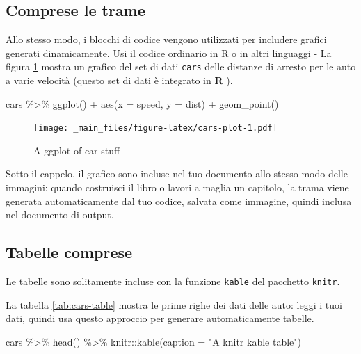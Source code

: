 \documentclass[a4paper, 11pt, nobind]{templates/ociamthesis}
\newenvironment{Shaded}{\begin{snugshade}}{\end{snugshade}}
\newcommand{\AttributeTok}[1]{\textcolor[rgb]{0.77,0.63,0.00}{#1}}
\newcommand{\FunctionTok}[1]{\textcolor[rgb]{0.00,0.00,0.00}{#1}}
\newcommand{\NormalTok}[1]{#1}
\newcommand{\SpecialCharTok}[1]{\textcolor[rgb]{0.00,0.00,0.00}{#1}}
\newcommand{\StringTok}[1]{\textcolor[rgb]{0.31,0.60,0.02}{#1}}
\renewenvironment{Shaded}
{
  \vspace{10pt}%
  \begin{snugshade}%
}{%
  \end{snugshade}%
  \vspace{8pt}%
}
\begin{document}
\hypertarget{comprese-le-trame}{%
\subsection{Comprese le trame}\label{comprese-le-trame}}

Allo stesso modo, i blocchi di codice vengono utilizzati per includere grafici generati dinamicamente.
Usi il codice ordinario in R o in altri linguaggi - La figura \ref{fig:cars-plot} mostra un grafico del set di dati \texttt{cars} delle distanze di arresto per le auto a varie velocità (questo set di dati è integrato in \textbf{R} ).

\begin{Shaded}
\begin{Highlighting}[]
\NormalTok{cars }\SpecialCharTok{\%\textgreater{}\%} 
  \FunctionTok{ggplot}\NormalTok{() }\SpecialCharTok{+}
    \FunctionTok{aes}\NormalTok{(}\AttributeTok{x =}\NormalTok{ speed, }\AttributeTok{y =}\NormalTok{ dist) }\SpecialCharTok{+}
    \FunctionTok{geom\_point}\NormalTok{()}
\end{Highlighting}
\end{Shaded}

\begin{figure}
\centering
\texttt{[image: \_main\_files/figure-latex/cars-plot-1.pdf]}
\caption{\label{fig:cars-plot}A ggplot of car stuff}
\end{figure}

Sotto il cappelo, il grafico sono incluse nel tuo documento allo stesso modo delle immagini: quando costruisci il libro o lavori a maglia un capitolo, la trama viene generata automaticamente dal tuo codice, salvata come immagine, quindi inclusa nel documento di output.

\hypertarget{tabelle-comprese}{%
\subsection{Tabelle comprese}\label{tabelle-comprese}}

Le tabelle sono solitamente incluse con la funzione \texttt{kable} del pacchetto \texttt{knitr}.

La tabella \ref{tab:cars-table} mostra le prime righe dei dati delle auto: leggi i tuoi dati, quindi usa questo approccio per generare automaticamente tabelle.

\begin{Shaded}
\begin{Highlighting}[]
\NormalTok{cars }\SpecialCharTok{\%\textgreater{}\%} 
  \FunctionTok{head}\NormalTok{() }\SpecialCharTok{\%\textgreater{}\%} 
\NormalTok{  knitr}\SpecialCharTok{::}\FunctionTok{kable}\NormalTok{(}\AttributeTok{caption =} \StringTok{"A knitr kable table"}\NormalTok{)}
\end{Highlighting}
\end{Shaded}
\end{document}
